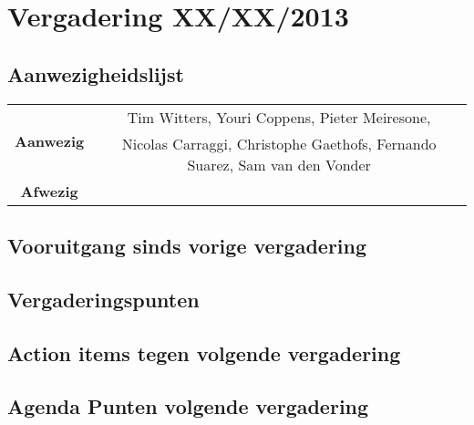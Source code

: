 \section{Vergadering XX/XX/2013}
\subsection{Aanwezigheidslijst}
\begin{table}[htbp]
	\centering
	\begin{tabular}{c|c}
		\multirow{2}{*}{\textbf{Aanwezig}} & Tim Witters, Youri Coppens, Pieter Meiresone, \\
		& Nicolas Carraggi,  Christophe Gaethofs, Fernando Suarez, Sam van den Vonder \\
		\hline
		\textbf{Afwezig} & \\
	\end{tabular}
\end{table}

\subsection{Vooruitgang sinds vorige vergadering}
\subsection{Vergaderingspunten}
\subsection{Action items tegen volgende vergadering}
\subsection{Agenda Punten volgende vergadering}

